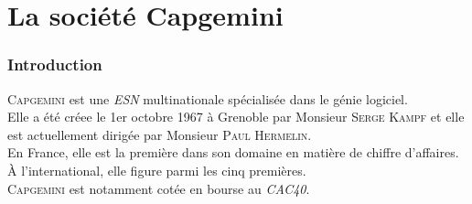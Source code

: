 \chapter{La société Capgemini}
\subsection*{Introduction}
\textsc{Capgemini} est une \textit{ESN} multinationale spécialisée dans le génie logiciel.
\\Elle a été créee le 1er octobre 1967 à Grenoble par Monsieur \textsc{Serge Kampf} et elle est actuellement dirigée par  Monsieur \textsc{Paul Hermelin}.\\
En France, elle est la première dans son domaine en matière de chiffre d'affaires. \`A l'international, elle figure parmi les cinq premières.
\\\textsc{Capgemini} est notamment cotée en bourse au \textit{CAC40}.
\\\\
\begin{figure}[h]
\end{figure}

\newpage
